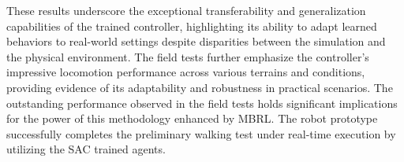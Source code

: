 These results underscore the exceptional transferability and generalization capabilities of the trained controller, highlighting its ability to adapt learned behaviors to real-world settings despite disparities between the simulation and the physical environment. The field tests further emphasize the controller's impressive locomotion performance across various terrains and conditions, providing evidence of its adaptability and robustness in practical scenarios. The outstanding performance observed in the field tests holds significant implications for the power of this methodology enhanced by MBRL. The robot prototype successfully completes the preliminary walking test under real-time execution by utilizing the SAC trained agents.